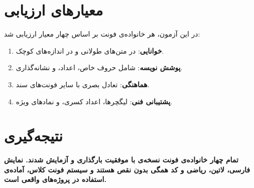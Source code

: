 \documentclass{matinbook}
\begin{document}
\section{معیارهای ارزیابی}
\label{sec:summary-criteria}

در این آزمون، هر خانواده‌ی فونت بر اساس چهار معیار ارزیابی شد:

\begin{enumerate}
    \item \textbf{خوانایی}: در متن‌های طولانی و در اندازه‌های کوچک.
    \item \textbf{پوشش نویسه}: شامل حروف خاص، اعداد، و نشانه‌گذاری.
    \item \textbf{هماهنگی}: تعادل بصری با سایر فونت‌های سند.
    \item \textbf{پشتیبانی فنی}: لیگچرها، اعداد کسری، و نمادهای ویژه.
\end{enumerate}

\section{نتیجه‌گیری}
\label{sec:summary-conclusion}

\textbf{تمام چهار خانواده‌ی فونت  نسخه‌ی
\lr{\matinbookversion} با موفقیت بارگذاری و آزمایش شدند.
نمایش فارسی، لاتین، ریاضی و کد همگی بدون نقص هستند و
سیستم فونت کلاس، آماده‌ی استفاده در پروژه‌های واقعی است.}

\backmatter
\frontmattergeometry

\printbibliography[title={منابع و مراجع}]

\printindex


\end{document}
